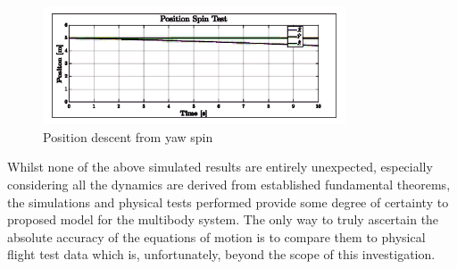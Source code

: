 \begin{figure}[htbp]
\centering
\vspace{-8pt}
\includegraphics[width=0.8\textwidth]{graphs/spin_position}
\vspace{-6pt}
\caption{Position descent from yaw spin}
\vspace{-10pt}
\label{fig:spin_position}
\end{figure}
\par
Whilst none of the above simulated results are entirely unexpected, especially considering all the dynamics are derived from established fundamental theorems, the simulations and physical tests performed provide some degree of certainty to proposed model for the multibody system. The only way to truly ascertain the absolute accuracy of the equations of motion is to compare them to physical flight test data which is, unfortunately, beyond the scope of this investigation.
